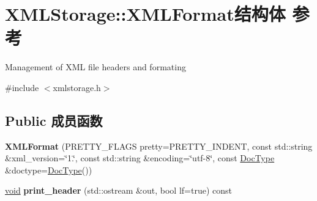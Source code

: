 \hypertarget{struct_x_m_l_storage_1_1_x_m_l_format}{}\section{X\+M\+L\+Storage\+:\+:X\+M\+L\+Format结构体 参考}
\label{struct_x_m_l_storage_1_1_x_m_l_format}


Management of X\+ML file headers and formating  




{\ttfamily \#include $<$xmlstorage.\+h$>$}

\subsection*{Public 成员函数}
\begin{DoxyCompactItemize}
\item 
\mbox{\label{struct_x_m_l_storage_1_1_x_m_l_format_a9b9b312f0923f7c7543f2464ee8ce2d3}} 
{\bfseries X\+M\+L\+Format} (P\+R\+E\+T\+T\+Y\+\_\+\+F\+L\+A\+GS pretty=P\+R\+E\+T\+T\+Y\+\_\+\+I\+N\+D\+E\+NT, const std\+::string \&xml\+\_\+version=\char`\"{}1.\char`\"{}, const std\+::string \&encoding=\char`\"{}utf-\/8\char`\"{}, const \hyperlink{struct_x_m_l_storage_1_1_doc_type}{Doc\+Type} \&doctype=\hyperlink{struct_x_m_l_storage_1_1_doc_type}{Doc\+Type}())
\item 
\mbox{\label{struct_x_m_l_storage_1_1_x_m_l_format_a0f78ea2b8e1dbf885fd9a2f11c804cf6}} 
\hyperlink{interfacevoid}{void} {\bfseries print\+\_\+header} (std\+::ostream \&out, bool lf=true) const
\end{DoxyCompactItemize}
